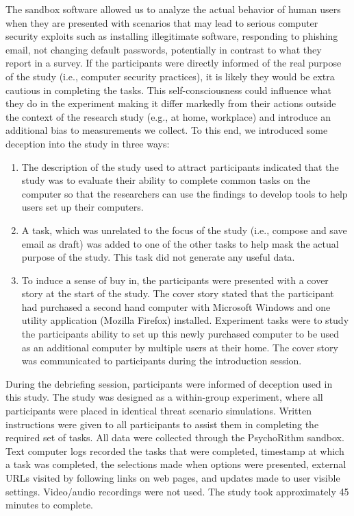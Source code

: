 The sandbox software allowed us to analyze the actual behavior of human users when they are presented with scenarios that may lead to serious computer security exploits such as installing illegitimate software, responding to phishing email, not changing default passwords, potentially in contrast to what they report in a survey. If the participants were directly informed of the real purpose of the study (i.e., computer security practices), it is likely they would be extra cautious in completing the tasks. This self-consciousness could influence what they do in the experiment making it differ markedly from their actions outside the context of the research study (e.g., at home, workplace) and introduce an additional bias to measurements we collect. To this end, we introduced some deception into the study in three ways:
\begin{enumerate}
\item The description of the study used to attract participants indicated that the study was to evaluate their ability to complete common tasks on the computer so that the researchers can
use the findings to develop tools to help users set up their computers.
\item A task, which was unrelated to the focus of the study (i.e., compose and save email as draft)
was added to one of the other tasks to help mask the actual purpose of the study. This task
did not generate any useful data.
\item To induce a sense of buy in, the participants were presented with a cover story at the start of
the study. The cover story stated that the participant had purchased a second hand computer
with Microsoft Windows and one utility application (Mozilla Firefox) installed. Experiment tasks were to study the participants ability to set up this newly purchased computer to be used as an additional computer by multiple users at their home. The cover story was
communicated to participants during the introduction session.
\end{enumerate}
During the debriefing session, participants were informed of deception used in this study. The study was designed as a within-group experiment, where all participants were placed in identical threat scenario simulations. Written instructions were given to all participants to assist them in completing the required set of tasks. All data were collected through the PsychoRithm sandbox. Text computer logs recorded the tasks that were completed, timestamp at which a task was completed, the selections made when options were presented, external URLs visited by following links on web pages, and updates made to user visible settings. Video/audio recordings were not used. The study took approximately 45 minutes to complete.


